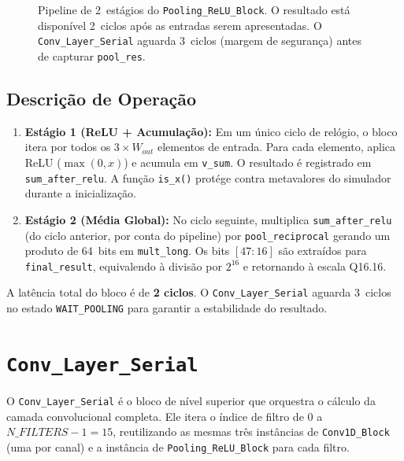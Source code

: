 \documentclass[a4paper,12pt]{article}
\begin{document}
\begin{figure}[H]
\caption{Pipeline de 2~est\'agios do \texttt{Pooling\_ReLU\_Block}. O resultado est\'a dispon\'ivel 2~ciclos ap\'os as entradas serem apresentadas. O \texttt{Conv\_Layer\_Serial} aguarda 3~ciclos (margem de seguran\c{c}a) antes de capturar \texttt{pool\_res}.}
\label{fig:pipeline_pool}
\end{figure}

\subsection{Descri\c{c}\~ao de Opera\c{c}\~ao}

\begin{enumerate}
    \item \textbf{Est\'agio 1 (ReLU + Acumula\c{c}\~ao):} Em um \'unico ciclo de rel\'ogio, o bloco itera por todos os $3 \times W_{out}$ elementos de entrada. Para cada elemento, aplica ReLU ($\max(0, x)$) e acumula em \texttt{v\_sum}. O resultado \'e registrado em \texttt{sum\_after\_relu}. A fun\c{c}\~ao \texttt{is\_x()} prot\'ege contra metavalores do simulador durante a inicializa\c{c}\~ao.
    \item \textbf{Est\'agio 2 (M\'edia Global):} No ciclo seguinte, multiplica \texttt{sum\_after\_relu} (do ciclo anterior, por conta do pipeline) por \texttt{pool\_reciprocal} gerando um produto de 64~bits em \texttt{mult\_long}. Os bits $[47\!:\!16]$ s\~ao extra\'idos para \texttt{final\_result}, equivalendo \`a divis\~ao por $2^{16}$ e retornando \`a escala Q16.16.
\end{enumerate}

A lat\^encia total do bloco \'e de \textbf{2 ciclos}. O \texttt{Conv\_Layer\_Serial} aguarda 3~ciclos no estado \texttt{WAIT\_POOLING} para garantir a estabilidade do resultado.


\section{\texttt{Conv\_Layer\_Serial}}

O \texttt{Conv\_Layer\_Serial} \'e o bloco de n\'ivel superior que orquestra o c\'alculo da camada convolucional completa. Ele itera o \'indice de filtro de 0 a $N\_FILTERS - 1 = 15$, reutilizando as mesmas tr\^es inst\^ancias de \texttt{Conv1D\_Block} (uma por canal) e a inst\^ancia de \texttt{Pooling\_ReLU\_Block} para cada filtro.
\end{document}
